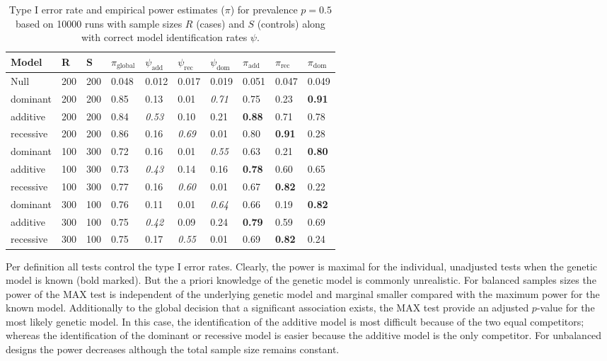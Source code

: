 \documentclass[bimj,fleqn]{w-art}
\begin{document}
\begin{table}
\begin{center}
\caption{Type I error rate and empirical power estimates ($\pi$) for prevalence $p=0.5$ based on 10000 runs
         with sample sizes $R$ (cases) and $S$ (controls) along with correct model identification rates
         $\psi$. \label{simtab}}
\vspace*{0.5cm}
  \begin{tabular}{l l l l| l l l |l l l}
        Model & R & S & $\pi_{\text{global}}$ &  $\psi_\text{add}$ & $\psi_\text{rec}$ & $\psi_\text{dom}$ & $\pi_\text{add}$ & $\pi_\text{rec}$ & $\pi_\text{dom}$   \\
 \hline
 Null & 200 & 200 & 0.048&  0.012 & 0.017&  0.019           &   0.051 & 0.047 & 0.049 \\
 dominant  & 200 & 200 & 0.85 &  0.13 &  0.01 &  \textit{0.71} & 0.75 &  0.23 &  \textbf{0.91} \\
 additive  & 200 & 200 & 0.84 &  \textit{0.53} & 0.10  & 0.21 &  \textbf{0.88} & 0.71 &  0.78 \\
 recessive  & 200 & 200 & 0.86 &  0.16 &  \textit{0.69} & 0.01 &  0.80 &  \textbf{0.91} & 0.28 \\
 dominant  & 100 & 300 & 0.72 &  0.16 &  0.01 &  \textit{0.55}&  0.63 &  0.21 & \textbf{0.80} \\
 additive  & 100 & 300 & 0.73 &  \textit{0.43} & 0.14 &  0.16 &  \textbf{0.78} & 0.60 &  0.65 \\
 recessive  & 100 & 300 & 0.77 &  0.16 &  \textit{0.60} & 0.01 &  0.67 &  \textbf{0.82} & 0.22  \\
 dominant  & 300 & 100 & 0.76 &  0.11 &  0.01 &  \textit{0.64} & 0.66 &  0.19 &  \textbf{0.82} \\
 additive  & 300 & 100 & 0.75 &  \textit{0.42} & 0.09 &  0.24 &  \textbf{0.79} & 0.59 &  0.69 \\
 recessive  & 300 & 100 & 0.75 &  0.17 &  \textit{0.55} & 0.01 &  0.69 &  \textbf{0.82 }& 0.24 \\
\hline
 \end{tabular}
\end{center}
 \end{table} 

 
Per definition all tests control the type I error rates. Clearly, the power is maximal for 
the individual, unadjusted tests when the genetic model is known (bold marked). But the a 
priori knowledge of the genetic model is commonly unrealistic. For balanced samples sizes the power 
of the MAX test is independent of the underlying genetic model and marginal smaller 
compared with the maximum power for the known model. Additionally to the global decision 
that a significant association exists, the MAX test provide an adjusted $p$-value for the 
most likely genetic model. In this case, the identification of the additive model is most difficult 
because of the two equal competitors; whereas the identification of the dominant or recessive 
model is easier because the additive model is the only competitor. For unbalanced 
designs the power decreases although the total sample size remains constant.
\end{document}
